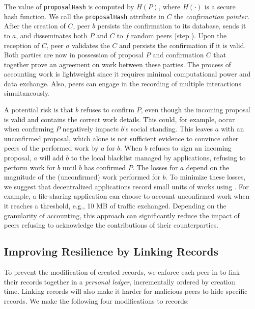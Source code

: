 The value of \texttt{proposalHash} is computed by $ H(P) $, where $ H(\cdot) $ is a secure hash function.
We call the \texttt{proposalHash} attribute in $ C $ the \emph{confirmation pointer}.
After the creation of $ C $, peer $ b $ persists the confirmation to its database, sends it to $ a $, and disseminates both $ P $ and $ C $ to $ f $ random peers (step ).
Upon the reception of $ C $, peer $ a $ validates the $ C $ and persists the confirmation if it is valid.
Both parties are now in possession of proposal $ P $ and confirmation $ C $ that together prove an agreement on work between these parties.
The process of accounting work is lightweight since it requires minimal computational power and data exchange. 
Also, peers can engage in the recording of multiple interactions simultaneously.

A potential risk is that $ b $ refuses to confirm $ P $, even though the incoming proposal is valid and contains the correct work details.
This could, for example, occur when confirming $ P $ negatively impacts $ b $'s social standing.
This leaves $ a $ with an unconfirmed proposal, which alone is not sufficient evidence to convince other peers of the performed work by $ a $ for $ b $.
When $ b $ refuses to sign an incoming proposal, $ a $ will add $ b $ to the local blacklist managed by applications, refusing to perform work for $ b $ until $ b $ has confirmed $ P $.
The losses for $ a $ depend on the magnitude of the (unconfirmed) work performed for $ b $.
To minimize these losses, we suggest that decentralized applications record small units of works using \TrustChain{}.
For example, a file-sharing application can choose to account unconfirmed work when it reaches a threshold, e.g., 10 MB of traffic exchanged.
Depending on the granularity of accounting, this approach can significantly reduce the impact of peers refusing to acknowledge the contributions of their counterparties.

\subsection{Improving Resilience by Linking Records}
To prevent the modification of created records, we enforce each peer in \TrustChain{} to link their records together in a \emph{personal ledger}, incrementally ordered by creation time.
Linking records will also make it harder for malicious peers to hide specific records.
We make the following four modifications to records:

